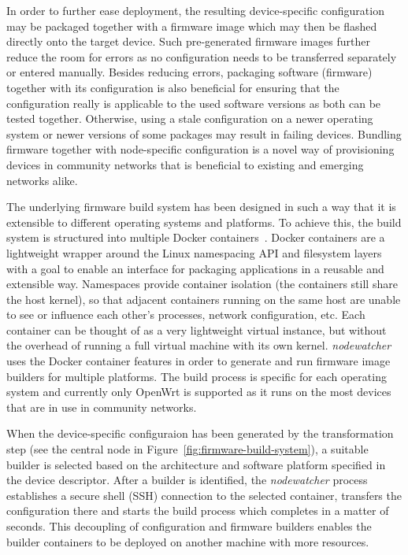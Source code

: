 \documentclass[5p,sort&compress]{elsarticle}
\newcommand{\nodewatcher}{\textit{nodewatcher}}
\begin{document}
In order to further ease deployment, the resulting device-specific configuration may be packaged together with a firmware image which may then be flashed directly onto the target device.
Such pre-generated firmware images further reduce the room for errors as no configuration needs to be transferred separately or entered manually.
Besides reducing errors, packaging software (firmware) together with its configuration is also beneficial for ensuring that the configuration really is applicable to the used software versions as both can be tested together.
Otherwise, using a stale configuration on a newer operating system or newer versions of some packages may result in failing devices.
Bundling firmware together with node-specific configuration is a novel way of provisioning devices in community networks  that is beneficial to existing and emerging networks alike.

The underlying firmware build system has been designed in such a way that it is extensible to different operating systems and platforms.
To achieve this, the build system is structured into multiple Docker containers~\cite{Docker_2013}.
Docker containers are a lightweight wrapper around the Linux namespacing API and filesystem layers with a goal to enable an interface for packaging applications in a reusable and extensible way.
Namespaces provide container isolation (the containers still share the host kernel), so that adjacent containers running on the same host are unable to see or influence each other's processes, network configuration, etc.
Each container can be thought of as a very lightweight virtual instance, but without the overhead of running a full virtual machine with its own kernel.
\nodewatcher{} uses the Docker container features in order to generate and run firmware image builders for multiple platforms.
The build process is specific for each operating system and currently only OpenWrt is supported as it runs on the most devices that are in use in community networks.

When the device-specific configuraion has been generated by the transformation step (see the central node in Figure~\ref{fig:firmware-build-system}), a suitable builder is selected based on the architecture and software platform specified in the device descriptor.
After a builder is identified, the \nodewatcher{} process establishes a secure shell (SSH) connection to the selected container, transfers the configuration there and starts the build process which completes in a matter of seconds.
This decoupling of configuration and firmware builders enables the builder containers to be deployed on another machine with more resources.
\end{document}
